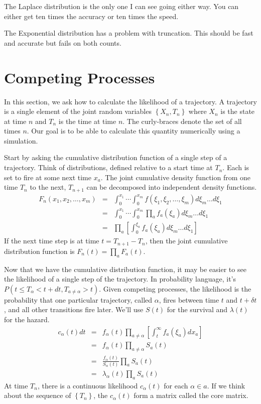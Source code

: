 \documentclass{article}
\begin{document}
The Laplace distribution is the only one I can see going either way. You can either get ten times the accuracy or ten times the speed.

The Exponential distribution has a problem with truncation. This should be fast and accurate but fails on both counts.


\section{Competing Processes}

In this section, we ask how to calculate the likelihood of a trajectory. A trajectory is a single element of the joint random variables $\left\{X_n,T_n\right\}$ where $X_n$ is the state at time $n$ and $T_n$ is the time at time $n$. The curly-braces denote the set of all times $n$. Our goal is to be able to calculate this quantity numerically using a simulation.

Start by asking the cumulative distribution function of a single step of a trajectory. Think of distributions, defined relative to a start time at $T_n$. Each is set to fire at some next time $x_a$. The joint cumulative density function from one time $T_n$ to the next, $T_{n+1}$ can be decomposed into independent density functions.
\begin{eqnarray}
	F_n(x_1, x_2,\ldots,x_m) &= &\int_0^{x_1}\cdots\int_0^{x_m}f(\xi_1,\xi_2,\ldots,\xi_m)d\xi_m\ldots d\xi_1 \\
	&= &\int_0^{x_1}\cdots\int_0^{x_m}\prod_a f_a(\xi_a)d\xi_m\ldots d\xi_1\ \\
	&= &\prod_a \left[\int_0^{\xi_a}f_a(\xi_a)d\xi_m\ldots d\xi_1\right]
\end{eqnarray}
If the next time step is at time $t=T_{n+1}-T_n$, then the joint cumulative distribution function is $F_n(t)=\prod_a F_a(t).$

Now that we have the cumulative distribution function, it may be easier to see the likelihood of a single step of the trajectory. In probability language, it's $P(t\le T_\alpha<t+dt,T_{a\ne\alpha} > t)$. Given competing processes, the likelihood is the probability that one particular trajectory, called $\alpha$, fires between time $t$ and $t+\delta t$, and all other transitions fire later. We'll use $S(t)$ for the survival and $\lambda(t)$ for the hazard.
\begin{eqnarray}
	c_{\alpha}(t)dt &=& f_{\alpha}(t)\prod_{a\ne\alpha}\left[\int_{t}^\infty f_a(\xi_a)dx_a\right] \\
	&=& f_{\alpha}(t)\prod_{a\ne\alpha}S_a(t) \\
	&=& \frac{f_{\alpha}(t)}{S_\alpha(t)}\prod_{a}S_a(t) \\
	&=& \lambda_{\alpha}(t)\prod_{a}S_a(t)
\end{eqnarray}
At time $T_n$, there is a continuous likelihood $c_\alpha(t)$ for each $\alpha\in a$. If we think about the sequence of $\left\{T_n\right\}$, the $c_\alpha(t)$ form a matrix called the core matrix.
\end{document}
